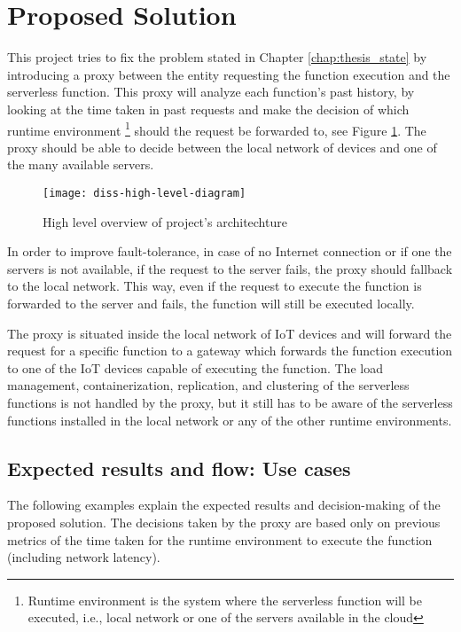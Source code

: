 \documentclass[conference]{IEEEtran}
\begin{document}
\section{Proposed Solution}

This project tries to fix the problem stated in Chapter \ref{chap:thesis_state} by
introducing a proxy between the entity requesting the function execution and the
serverless function. This proxy will analyze each function's past history, by
looking at the time taken in past requests and make the decision of which runtime
environment \footnote{Runtime environment is the system where the serverless
function will be executed, i.e., local network or one of the servers available in
the cloud} should the request be forwarded to, see Figure
\ref{fig:request_func_high_level_diagram}. The proxy should be able to decide
between the local network of devices and one of the many available servers.

\begin{figure}[ht]
  \centering
  \texttt{[image: diss-high-level-diagram]}
  \caption{High level overview of project's architechture}
  \label{fig:request_func_high_level_diagram}
\end{figure}

In order to improve fault-tolerance, in case of no Internet connection or if
one the servers is not available, if the request to the server fails, the proxy
should fallback to the local network. This way, even if the request to execute the
function is forwarded to the server and fails, the function will still be executed
locally.

The proxy is situated inside the local network of IoT devices and will forward the
request for a specific function to a gateway which forwards the function execution to
one of the IoT devices capable of executing the function. The load management,
containerization, replication, and clustering of the serverless functions is not
handled by the proxy, but it still has to be aware of the serverless functions
installed in the local network or any of the other runtime environments.

\subsection{Expected results and flow: Use cases}
\label{overview:usecases}
The following examples explain the expected results and decision-making of the
proposed solution. The decisions taken by the proxy are based only on previous
metrics of the time taken for the runtime environment to execute the function
(including network latency).
\end{document}
